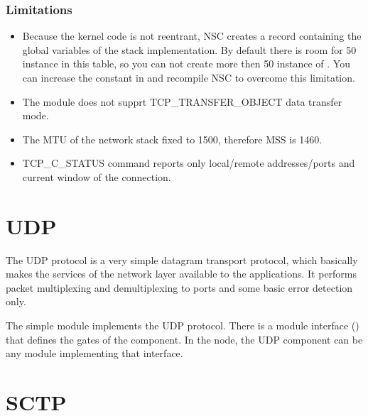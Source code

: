 \subsubsection*{Limitations}

\begin{itemize}
  \item Because the kernel code is not reentrant, NSC creates a record containing
    the global variables of the stack implementation. By default there is room
    for 50 instance in this table, so you can not create more then 50 instance
    of . You can increase the  constant
    in  and recompile NSC to overcome this limitation.
  \item The  module does not supprt TCP\_TRANSFER\_OBJECT
    data transfer mode.
  \item The MTU of the network stack fixed to 1500, therefore MSS is 1460.
  \item TCP\_C\_STATUS command reports only local/remote addresses/ports and
    current window of the connection.
\end{itemize}




\section{UDP}
\label{sec:transport:udp}

The UDP protocol is a very simple datagram transport protocol, which
basically makes the services of the network layer available to the applications.
It performs packet multiplexing and demultiplexing to ports and some basic
error detection only.

The  simple module implements the UDP protocol.
There is a module interface () that defines the gates of the
 component. In the  node, the UDP component
can be any module implementing that interface.

\section{SCTP}
\label{sec:transport:sctp}

